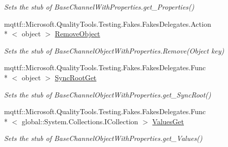 \begin{DoxyCompactItemize}
\begin{DoxyCompactList}\small\item\em Sets the stub of Base\-Channel\-With\-Properties.\-get\-\_\-\-Properties()\end{DoxyCompactList}\item 
mqttf\-::\-Microsoft.\-Quality\-Tools.\-Testing.\-Fakes.\-Fakes\-Delegates.\-Action\\*
$<$ object $>$ \hyperlink{class_system_1_1_runtime_1_1_remoting_1_1_channels_1_1_fakes_1_1_stub_base_channel_with_properties_a88ba238e5392bbcfb87b6050972be22e}{Remove\-Object}
\begin{DoxyCompactList}\small\item\em Sets the stub of Base\-Channel\-Object\-With\-Properties.\-Remove(\-Object key)\end{DoxyCompactList}\item 
mqttf\-::\-Microsoft.\-Quality\-Tools.\-Testing.\-Fakes.\-Fakes\-Delegates.\-Func\\*
$<$ object $>$ \hyperlink{class_system_1_1_runtime_1_1_remoting_1_1_channels_1_1_fakes_1_1_stub_base_channel_with_properties_aa570c6bccd3e42ed18c2215e6a87cfd3}{Sync\-Root\-Get}
\begin{DoxyCompactList}\small\item\em Sets the stub of Base\-Channel\-Object\-With\-Properties.\-get\-\_\-\-Sync\-Root()\end{DoxyCompactList}\item 
mqttf\-::\-Microsoft.\-Quality\-Tools.\-Testing.\-Fakes.\-Fakes\-Delegates.\-Func\\*
$<$ global\-::\-System.\-Collections.\-I\-Collection $>$ \hyperlink{class_system_1_1_runtime_1_1_remoting_1_1_channels_1_1_fakes_1_1_stub_base_channel_with_properties_aecd31387b1e94c55ab71ffa862474f04}{Values\-Get}
\begin{DoxyCompactList}\small\item\em Sets the stub of Base\-Channel\-Object\-With\-Properties.\-get\-\_\-\-Values()\end{DoxyCompactList}\end{DoxyCompactItemize}
